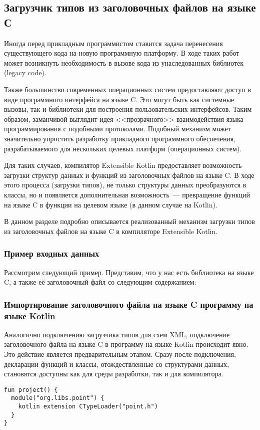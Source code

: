 \subsection{Загрузчик типов из заголовочных файлов на языке С}\label{c-loader}
Иногда перед прикладным программистом ставится задача перенесения существующего кода на новую программную платформу.
В ходе таких работ может возникнуть необходимость в вызове кода из унаследованных библиотек (legacy code).

Также большинство современных операционных систем предоставляют доступ в виде программного интерфейса на языке C.
Это могут быть как системные вызовы, так и библиотеки для построения пользовательских интерфейсов.
Таким образом, заманчивой выглядит идея <<прозрачного>> взаимодействия языка программирования с подобными протоколами.
Подобный механизм может значительно упростить разработку прикладного программного обеспечения, разрабатываемого для нескольких целевых платформ (операционных систем).

Для таких случаев, компилятор Extensible Kotlin предоставляет возможность загрузки структур данных и функций из заголовочных файлов на языке C.
В ходе этого процесса (загрузки типов), не только структуры данных преобразуются в классы, но и появляется дополнительная возможность~--- превращение функций на языке C в функции на целевом языке (в данном случае на Kotlin).

В данном разделе подробно описывается реализованный механизм загрузки типов из заголовочных файлов на языке C в компиляторе Extensible Kotlin.

\begin{code}
\subsubsection{Пример входных данных}
Рассмотрим следующий пример. Представим, что у нас есть библиотека на языке C, а также её заголовочный файл со следующим содержанием:

\end{code}

\subsubsection{Импортирование заголовочного файла на языке C программу на языке Kotlin}
Аналогично подключению загрузчика типов для схем XML, подключение заголовочного файла на языке C в программу на языке Kotlin происходит явно.
Это действие является предварительным этапом. Сразу после подключения, декларации функций и классы, отождествленные со структурами данных, становятся доступны как для среды разработки, так и для компилятора.
\begin{code}\begin{lstlisting}[caption={Подключение заголовочного файла на языке C в программу на языке Kotlin.}, label={c-type-loading-extension-point}]
fun project() {
  module("org.libs.point") {
    kotlin extension CTypeLoader("point.h")
  }
}
\end{lstlisting}\end{code}

